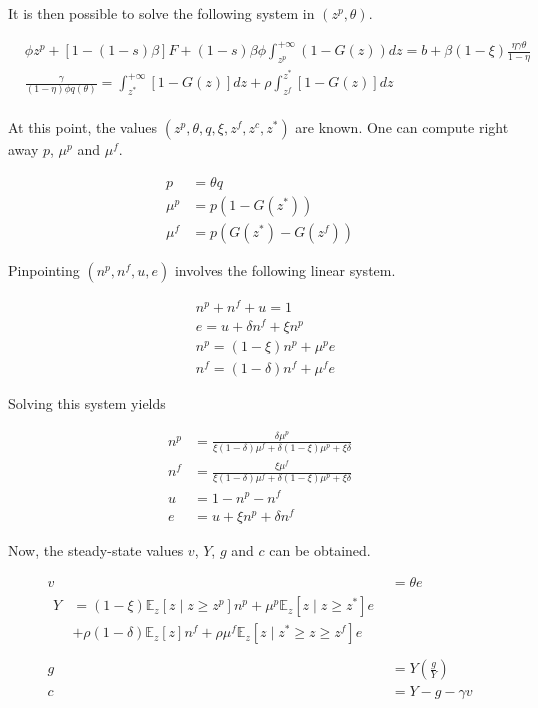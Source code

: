 It is then possible to solve the following system in $\left( z^p , \theta \right)$.

\begin{align*}
&\phi z^p + \left[ 1 - (1-s)  \beta \right] F + (1-s)  \beta \phi \int_{z^p}^{+\infty} \left( 1 - G(z) \right) dz = b + \beta \left( 1 - \xi \right) \frac{\eta \gamma \theta}{1-\eta}\\
&\frac{\gamma}{(1-\eta) \phi q\left( \theta \right)} = \int_{z^*}^{+\infty} \left[ 1 - G(z) \right] dz + \rho \int_{z^f}^{z^*} \left[ 1 - G(z) \right] dz\\
\end{align*}

At this point, the values $\left( z^p , \theta, q, \xi, z^f, z^c, z^* \right)$ are known. One can compute right away $p$, $\mu^p$ and $\mu^f$.

\begin{align*}
p &= \theta q\\
\mu^p &= p \left( 1-G\left( z^*\right)\right)\\
\mu^f &= p \left( G\left( z^*\right) - G\left( z^f\right)\right)
\end{align*} 

Pinpointing $\left( n^p, n^f, u, e\right)$ involves the following linear system.

\begin{align*}
    &n^p + n^f + u = 1\\
    &e = u + \delta n^f + \xi n^p\\
    &n^p =  \left(1-\xi\right) n^p + \mu^p e\\
    &n^f =  \left(1-\delta\right) n^f + \mu^f e
\end{align*}

Solving this system yields

\begin{align*}
n^p &= \frac{\delta \mu^p}{\xi (1-\delta) \mu^f + \delta (1-\xi) \mu^p + \xi \delta}\\
n^f &= \frac{\xi \mu^f}{\xi (1-\delta) \mu^f + \delta (1-\xi) \mu^p + \xi \delta}\\
u &= 1-n^p-n^f\\
e &= u+\xi n^p + \delta n^f
\end{align*}

Now, the steady-state values $v$, $Y$, $g$ and $c$ can be obtained.

\begin{align*}
v &= \theta e\\
\begin{split}
Y &= \left(1-\xi\right) \mathbb{E}_z \left[z \mid z \geq z^p \right] n^p + \mu^p \mathbb{E}_z \left[z \mid z \geq z^* \right] e\\
&+ \rho \left(1-\delta\right)  \mathbb{E}_z \left[ z \right]  n^f + \rho \mu^f \mathbb{E}_z \left[z \mid z^* \geq z \geq z^f \right] e\\
\end{split}\\
g &= Y \left( \frac{g}{Y} \right)\\
c &= Y-g-\gamma v
\end{align*}

